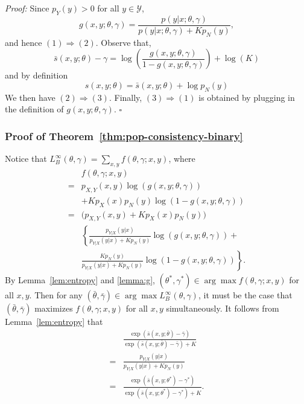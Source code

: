\documentclass[11pt,a4paper]{article}
\newcommand{\qed}{\square}
\newcommand{\str}[3]{s(#1, #2; #3)}
\newcommand{\ssf}[3]{\bar{s}(#1, #2; #3)}
\begin{document}
{\em Proof:} 
Since $p_Y(y) > 0$ for all $y\in\mathcal{Y}$,  
\[
g(x, y; \theta, \gamma) = \frac{  p(y | x; \theta, \gamma)}{p(y | x; \theta, \gamma) + Kp_N(y)},
\]
and hence $(1) \Rightarrow (2)$. Observe that,  
\[
\ssf{x}{y}{\theta} - \gamma = \log \left(\frac{g(x, y; \theta, \gamma) }{1 - g(x, y; \theta, \gamma)}\right) + \log(K)
\]
and by definition
\[
\str{x}{y}{\theta} = \ssf{x}{y}{\theta} + \log p_N(y)
\]
We then have $(2) \Rightarrow (3)$. Finally, $(3)\Rightarrow (1)$ is obtained by plugging in the definition of $g(x, y; \theta, \gamma)$.
$\qed$


\subsubsection{Proof of Theorem~\ref{thm:pop-consistency-binary}}
\label{sec:pf-pop-consis-binary}
Notice that $L_B^\infty\left(\theta, \gamma \right) = \sum_{x, y} f(\theta, \gamma; x, y)$, where
\begin{equation*}
\begin{aligned}
& f(\theta, \gamma; x, y) \\
 = & p_{X, Y}(x, y)\log\left(g(x, y; \theta, \gamma) \right)  \\
& + K p_X(x)p_N(y) \log\left(1- g(x, y; \theta, \gamma)\right) \\
= &  \Big(p_{X, Y}(x, y) + K p_X(x)p_N(y)\Big) \\
& \left\{  \frac{p_{Y|X}(y|x)}{p_{Y|X}(y|x) + K p_N(y)} \log\left(g(x, y; \theta, \gamma) \right)  + \right. \\
& \left.  \frac{K p_N(y)}{p_{Y|X}(y|x) + K p_N(y)} \log\left(1- g(x, y; \theta, \gamma)\right)\right\}.
\end{aligned}
\end{equation*}
By Lemma~\ref{lem:entropy} and \ref{lemma:g}, $(\theta^*, \gamma^*) \in \arg\max f(\theta, \gamma; x, y)$ for all $x, y$. 
Then for any $(\bar{\theta}, \bar{\gamma}) \in\arg\max L_B^\infty(\theta, \gamma)$, it must be the case that $(\bar{\theta}, \bar{\gamma})$ maximizes $f(\theta, \gamma; x, y)$ for all $x, y$ simultaneously. It follows from Lemma~\ref{lem:entropy} that 
\begin{equation*}
\begin{aligned}
        & \frac{\exp(\ssf{x}{y}{\bar{\theta}} - \bar{\gamma})}{\exp(\ssf{x}{y}{\bar{\theta}} - \bar{\gamma}) + K} \\
       =  & \frac{p_{Y|X}(y|x)}{p_{Y|X}(y|x) + K p_N(y)}  \\
       =  & \frac{\exp(\ssf{x}{y}{\theta^*} - \gamma^*)}{ \exp(\ssf{x}{y}{\theta^*} - \gamma^*) + K}. 
\end{aligned}
\end{equation*}
\end{document}
